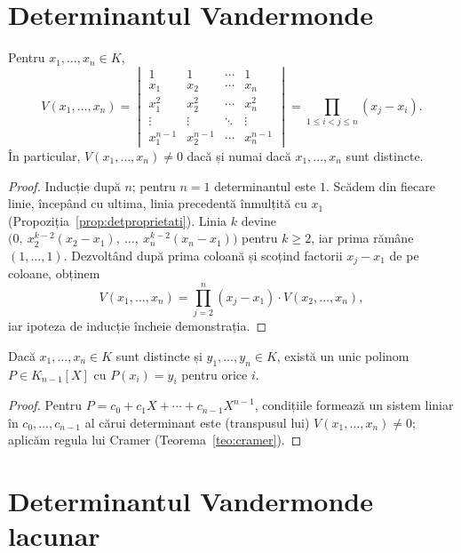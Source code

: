 \section{Determinantul Vandermonde}

\begin{teorema}\label{teo:vandermonde}
Pentru $x_1,\dots,x_n\in K$,
\[
V(x_1,\dots,x_n)=
\begin{vmatrix}
1 & 1 & \cdots & 1 \\
x_1 & x_2 & \cdots & x_n \\
x_1^2 & x_2^2 & \cdots & x_n^2 \\
\vdots & \vdots & \ddots & \vdots \\
x_1^{n-1} & x_2^{n-1} & \cdots & x_n^{n-1}
\end{vmatrix}
=\prod_{1\le i<j\le n}(x_j-x_i).
\]
În particular, $V(x_1,\dots,x_n)\neq0$ dacă și numai dacă $x_1,\dots,x_n$ sunt distincte.
\end{teorema}

\begin{proof}
Inducție după $n$; pentru $n=1$ determinantul este $1$. Scădem din fiecare linie, începând cu ultima, linia precedentă înmulțită cu $x_1$ (Propoziția~\ref{prop:detproprietati}). Linia $k$ devine $\bigl(0,\ x_2^{k-2}(x_2-x_1),\ \dots,\ x_n^{k-2}(x_n-x_1)\bigr)$ pentru $k\ge2$, iar prima rămâne $(1,\dots,1)$. Dezvoltând după prima coloană și scoțind factorii $x_j-x_1$ de pe coloane, obținem
\[
V(x_1,\dots,x_n)=\prod_{j=2}^n(x_j-x_1)\cdot V(x_2,\dots,x_n),
\]
iar ipoteza de inducție încheie demonstrația.
\end{proof}

\begin{corolar}[Interpolare]\label{cor:interpolare}
Dacă $x_1,\dots,x_n\in K$ sunt distincte și $y_1,\dots,y_n\in K$, există un unic polinom $P\in K_{n-1}[X]$ cu $P(x_i)=y_i$ pentru orice $i$.
\end{corolar}

\begin{proof}
Pentru $P=c_0+c_1X+\cdots+c_{n-1}X^{n-1}$, condițiile formează un sistem liniar în $c_0,\dots,c_{n-1}$ al cărui determinant este (transpusul lui) $V(x_1,\dots,x_n)\neq0$; aplicăm regula lui Cramer (Teorema~\ref{teo:cramer}).
\end{proof}

\section{Determinantul Vandermonde lacunar}

